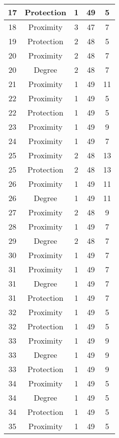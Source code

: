 \documentclass[results.tex]{subfiles}
\begin{document}
\begin{center}
\begin{tabular}{| c || c | c | c | c |}
    \hline
    17 & Protection & 1 & 49 & 5 \\ 
    \hline
    18 & Proximity & 3 & 47 & 7 \\ 
    \hline
    19 & Protection & 2 & 48 & 5 \\ 
    \hline
    20 & Proximity & 2 & 48 & 7 \\ 
    \hline
    20 & Degree & 2 & 48 & 7 \\ 
    \hline
    21 & Proximity & 1 & 49 & 11 \\ 
    \hline
    22 & Proximity & 1 & 49 & 5 \\ 
    \hline
    22 & Protection & 1 & 49 & 5 \\ 
    \hline
    23 & Proximity & 1 & 49 & 9 \\ 
    \hline
    24 & Proximity & 1 & 49 & 7 \\ 
    \hline
    25 & Proximity & 2 & 48 & 13 \\ 
    \hline
    25 & Protection & 2 & 48 & 13 \\ 
    \hline
    26 & Proximity & 1 & 49 & 11 \\ 
    \hline
    26 & Degree & 1 & 49 & 11 \\ 
    \hline
    27 & Proximity & 2 & 48 & 9 \\ 
    \hline
    28 & Proximity & 1 & 49 & 7 \\ 
    \hline
    29 & Degree & 2 & 48 & 7 \\ 
    \hline
    30 & Proximity & 1 & 49 & 7 \\ 
    \hline
    31 & Proximity & 1 & 49 & 7 \\ 
    \hline
    31 & Degree & 1 & 49 & 7 \\ 
    \hline
    31 & Protection & 1 & 49 & 7 \\ 
    \hline
    32 & Proximity & 1 & 49 & 5 \\ 
    \hline
    32 & Protection & 1 & 49 & 5 \\ 
    \hline
    33 & Proximity & 1 & 49 & 9 \\ 
    \hline
    33 & Degree & 1 & 49 & 9 \\ 
    \hline
    33 & Protection & 1 & 49 & 9 \\ 
    \hline
    34 & Proximity & 1 & 49 & 5 \\ 
    \hline
    34 & Degree & 1 & 49 & 5 \\ 
    \hline
    34 & Protection & 1 & 49 & 5 \\ 
    \hline
    35 & Proximity & 1 & 49 & 5 \\ 

\end{tabular}
\end{center}
\end{document}
